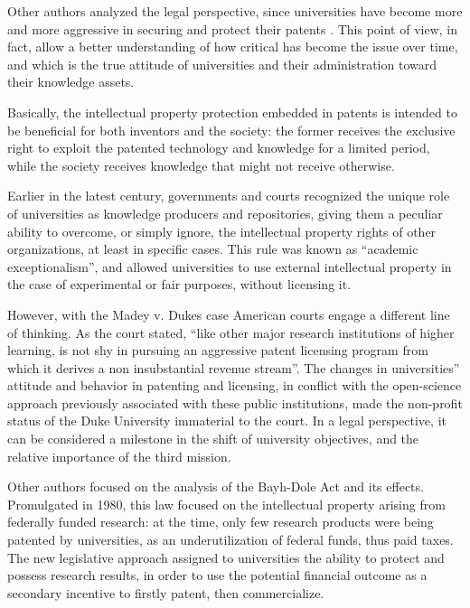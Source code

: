 Other authors analyzed the legal perspective, since universities have become more and more aggressive in securing and protect their patents \citep{Wysocki2004}. This point of view, in fact, allow a better understanding of how critical has become the issue over time, and which is the true attitude of universities and their administration toward their knowledge assets.

Basically, the intellectual property protection embedded in patents is intended to be beneficial for both inventors and the society: the former receives the exclusive right to exploit the patented technology and knowledge for a limited period, while the society receives knowledge that might not receive otherwise. 

Earlier in the latest century, governments and courts recognized the unique role of universities as knowledge producers and repositories, giving them a peculiar ability to overcome, or simply ignore, the intellectual property rights of other organizations, at least in specific cases. This rule was known as \enquote{academic exceptionalism}, and allowed universities to use external intellectual property in the case of experimental or fair purposes, without licensing it.

However, with the Madey v. Dukes case \citep{Hayter2016} American courts engage a different line of thinking. As the court stated, \enquote{like other major research institutions of higher learning, is not shy in pursuing an aggressive patent licensing program from which it derives a non insubstantial revenue stream}. The changes in universities'' attitude and behavior in patenting and licensing, in conflict with the open-science approach previously associated with these public institutions, made the non-profit status of the Duke University immaterial to the court. In a legal perspective, it can be considered a milestone in the shift of university objectives, and the relative importance of the third mission.

Other authors focused on the analysis of the Bayh-Dole Act and its effects. Promulgated in 1980, this law focused on the intellectual property arising from federally funded research: at the time, only few research products were being patented by universities, as an underutilization of federal funds, thus paid taxes. The new legislative approach assigned to universities the ability to protect and possess research results, in order to use the potential financial outcome as a secondary incentive to firstly patent, then commercialize. 

